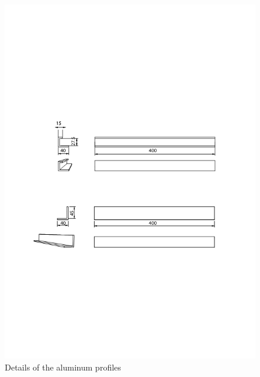 \begin{figure}[h]
\centering
\includegraphics[width=15cm]{images/metaisMedidas.png}
\caption{Details of the aluminum profiles }
\label{fig:aluminumprofiles}
\end{figure}